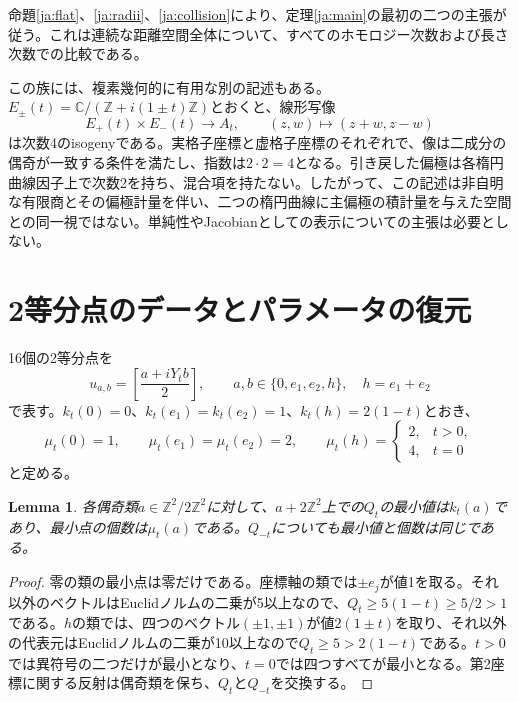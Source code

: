 \documentclass[12pt]{amsart}
\newcommand{\LemmaName}{Lemma}
\newtheorem{lem}[thm]{\LemmaName}
\theoremstyle{definition}
\theoremstyle{remark}
\numberwithin{equation}{section}
\newcommand{\Z}{\mathbb{Z}}
\newcommand{\C}{\mathbb{C}}
\begin{document}
命題\ref{ja:flat}、\ref{ja:radii}、\ref{ja:collision}により、定理\ref{ja:main}の最初の二つの主張が従う。これは連続な距離空間全体について、すべてのホモロジー次数および長さ次数での比較である。

この族には、複素幾何的に有用な別の記述もある。
$E_\pm(t)=\C/(\Z+i(1\pm t)\Z)$とおくと、線形写像
\begin{equation}\label{ja:gluing}
E_+(t)\times E_-(t)\longrightarrow A_t,
\qquad (z,w)\longmapsto(z+w,z-w)
\end{equation}
は次数4のisogenyである。実格子座標と虚格子座標のそれぞれで、像は二成分の偶奇が一致する条件を満たし、指数は$2\cdot2=4$となる。引き戻した偏極は各楕円曲線因子上で次数2を持ち、混合項を持たない。したがって、この記述は非自明な有限商とその偏極計量を伴い、二つの楕円曲線に主偏極の積計量を与えた空間との同一視ではない。単純性やJacobianとしての表示についての主張は必要としない。

\section{2等分点のデータとパラメータの復元}
16個の2等分点を
\[
u_{a,b}=\left[\frac{a+iY_tb}{2}\right],\qquad
a,b\in\{0,e_1,e_2,h\},\quad h=e_1+e_2
\]
で表す。$k_t(0)=0$、$k_t(e_1)=k_t(e_2)=1$、$k_t(h)=2(1-t)$とおき、
\[
\mu_t(0)=1,\qquad \mu_t(e_1)=\mu_t(e_2)=2,
\qquad
\mu_t(h)=\begin{cases}2,&t>0,\\4,&t=0\end{cases}
\]
と定める。

\begin{lem}\label{ja:parity}
各偶奇類$a\in\Z^2/2\Z^2$に対して、$a+2\Z^2$上での$Q_t$の最小値は$k_t(a)$であり、最小点の個数は$\mu_t(a)$である。$Q_{-t}$についても最小値と個数は同じである。
\end{lem}
\begin{proof}
零の類の最小点は零だけである。座標軸の類では$\pm e_j$が値1を取る。それ以外のベクトルはEuclidノルムの二乗が5以上なので、$Q_t\geq5(1-t)\geq5/2>1$である。$h$の類では、四つのベクトル$(\pm1,\pm1)$が値$2(1\pm t)$を取り、それ以外の代表元はEuclidノルムの二乗が10以上なので$Q_t\geq5>2(1-t)$である。$t>0$では異符号の二つだけが最小となり、$t=0$では四つすべてが最小となる。第2座標に関する反射は偶奇類を保ち、$Q_t$と$Q_{-t}$を交換する。
\end{proof}
\end{document}
